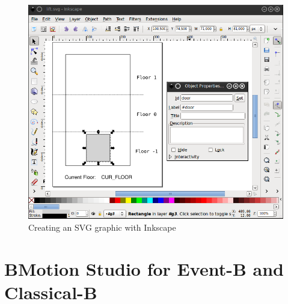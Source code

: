\documentclass[twoside,10pt]{book}
\begin{document}
\begin{figure}[!ht]
\begin{center}
	\includegraphics[width=12cm]{img/tutorial/tut_02.png}
	\caption{Creating an SVG graphic with Inkscape}
	\label{fig_tut_02_inkscape}
\end{center}
\end{figure}

\chapter{BMotion Studio for Event-B and Classical-B}
\label{bms4b}



%



\clearpage
{}
{} 
\printindex
\end{document}
